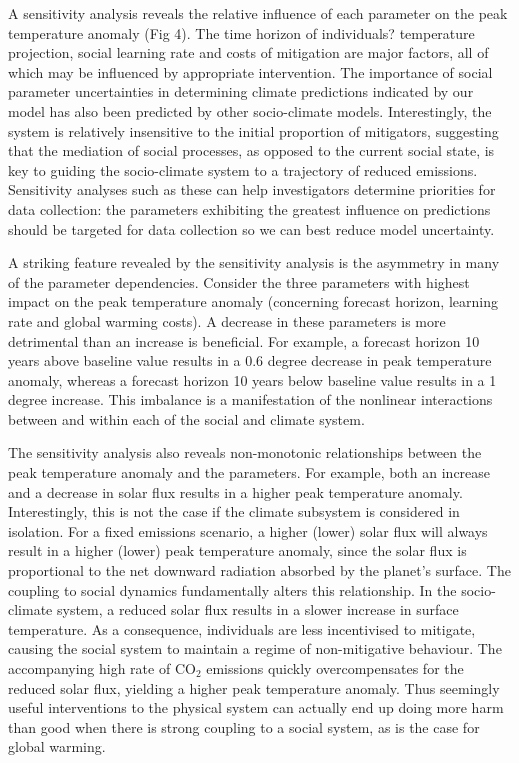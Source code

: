 \documentclass[10pt,letterpaper]{article}
\begin{document}
A sensitivity analysis reveals the relative influence of each parameter on the peak temperature anomaly (Fig 4). The time horizon of individuals? temperature projection, social learning rate and costs of mitigation are major factors, all of which may be influenced by appropriate intervention. The importance of social parameter uncertainties in determining climate predictions indicated by our model has also been predicted by other socio-climate models\cite{beckage18}. Interestingly, the system is relatively insensitive to the initial proportion of mitigators, suggesting that the mediation of social processes, as opposed to the current social state, is key to guiding the socio-climate system to a trajectory of reduced emissions. Sensitivity analyses such as these can help investigators determine priorities for data collection: the parameters exhibiting the greatest influence on predictions should be targeted for data collection so we can best reduce model uncertainty.

A striking feature revealed by the sensitivity analysis is the asymmetry in many of the parameter dependencies. Consider the three parameters with highest impact on the peak temperature anomaly (concerning forecast horizon, learning rate and global warming costs). A decrease in these parameters is more detrimental than an increase is beneficial. For example, a forecast horizon 10 years above baseline value results in a 0.6 degree decrease in peak temperature anomaly, whereas a forecast horizon 10 years below baseline value results in a 1 degree increase. This imbalance is a manifestation of the nonlinear interactions between and within each of the social and climate system.

The sensitivity analysis also reveals non-monotonic relationships between the peak temperature anomaly and the parameters. For example, both an increase and a decrease in solar flux results in a higher peak temperature anomaly. Interestingly, this is not the case if the climate subsystem is considered in isolation. For a fixed emissions scenario, a higher (lower) solar flux will always result in a higher (lower) peak temperature anomaly, since the solar flux is proportional to the net downward radiation absorbed by the planet's surface. The coupling to social dynamics fundamentally alters this relationship. In the socio-climate system, a reduced solar flux results in a slower increase in surface temperature. As a consequence, individuals are less incentivised to mitigate, causing the social system to maintain a regime of non-mitigative behaviour. The accompanying high rate of $\text{CO}_2$ emissions quickly overcompensates for the reduced solar flux, yielding a higher peak temperature anomaly. Thus seemingly useful interventions to the physical system can actually end up doing more harm than good when there is strong coupling to a social system, as is the case for global warming.
\end{document}
